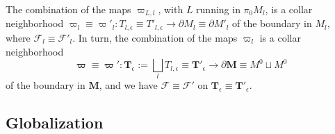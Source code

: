 \documentclass{memo-l}
\theoremstyle{plain}
\theoremstyle{definition}
\theoremstyle{remark}
\newcommand{\FF}{\mathcal{F}}
\newcommand{\bfM}{\boldsymbol{M}}
\newcommand{\bfT}{\boldsymbol{T}}
\newcommand{\bfFF}{\boldsymbol{\FF}}
\newcommand{\bfvarpi}{\boldsymbol{\varpi}}
\numberwithin{section}{chapter}
\numberwithin{equation}{section}%
\begin{document}
The combination of the maps $\varpi_{L,l}$, with $L$ running in $\pi_0M_l$, is a collar neighborhood $\varpi_l\equiv\varpi'_l:T_{l,\epsilon}\equiv T'_{l,\epsilon}\to\partial M_l\equiv\partial M'_l$ of the boundary in $M_l$, where $\FF_l\equiv\FF'_l$. In turn, the combination of the maps $\varpi_l$ is a collar neighborhood
\[
\bfvarpi\equiv\bfvarpi':\bfT_\epsilon:=\bigsqcup_lT_{l,\epsilon}\equiv\bfT'_\epsilon\to\partial\bfM\equiv M^0\sqcup M^0
\]
of the boundary in $\bfM$, and we have $\bfFF\equiv\bfFF'$ on $\bfT_\epsilon\equiv\bfT'_\epsilon$.



\subsection{Globalization}\label{ss: globalization}
\end{document}
